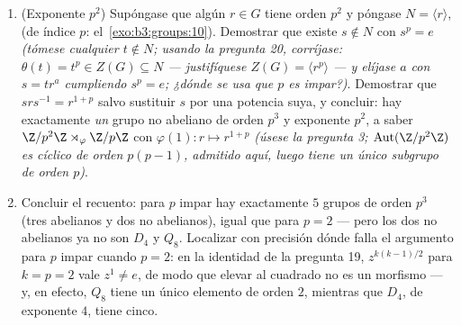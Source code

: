 \begin{problem}
\begin{enumerate}[resume]
        $N^3 = 0$ y $p \geq 3$): todo grupo no abeliano de orden $p^3$ y
        exponente $p$ es isomorfo a $H_p$. \item (Exponente $p^2$)
        Supóngase que algún $r \in G$ tiene orden $p^2$ y póngase
        $N = \langle r\rangle$, 
        (de índice $p$: el~\cref{exo:b3:groups:10}). Demostrar que
        existe $s \notin N$ con $s^p = e$ \emph{(tómese cualquier
        $t \notin N$; usando la pregunta 20, corríjase:
        $\theta(t) = t^p \in Z(G) \subseteq N$ --- justifíquese
        $Z(G) = \langle r^p\rangle$ --- y elíjase $a$ con $s = tr^{a}$
        cumpliendo $s^p = e$; ¿dónde se usa que $p$ es impar?)}.
        Demostrar que $srs^{-1} = r^{1+p}$ salvo sustituir $s$ por una
        potencia suya, y concluir: hay exactamente \emph{un} grupo no
        abeliano de orden $p^3$ y exponente $p^2$, a saber
        $\Z/p^2\Z \rtimes_\varphi \Z/p\Z$ con
        $\varphi(1)\colon r \mapsto r^{1+p}$ \emph{(úsese la pregunta 3;
        $\operatorname{Aut}(\Z/p^2\Z)$ es cíclico de orden $p(p-1)$,
        admitido aquí, luego tiene un único subgrupo de orden $p$)}.
        \item Concluir el recuento: para $p$ impar hay exactamente $5$
        grupos de orden $p^3$ (tres abelianos y dos no abelianos), igual
        que para $p = 2$ --- pero los dos no abelianos ya no son $D_4$ y
        $Q_8$. Localizar con precisión dónde falla el argumento para $p$
        impar cuando $p = 2$: en la identidad de la pregunta 19,
        $z^{k(k-1)/2}$ para $k = p = 2$ vale $z^1 \neq
        e$, de modo que elevar al cuadrado no es un morfismo --- y, en
        efecto, $Q_8$ tiene un único elemento de orden $2$, mientras que
        $D_4$, de exponente $4$, tiene cinco.
\end{enumerate}


\end{problem}
